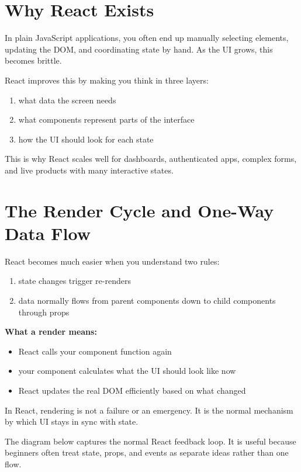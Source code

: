 \documentclass[12pt, a4paper, oneside]{book}
\begin{document}
\section{Why React Exists}

In plain JavaScript applications, you often end up manually selecting elements, updating the DOM, and coordinating state by hand. As the UI grows, this becomes brittle.

React improves this by making you think in three layers:
\begin{enumerate}[leftmargin=2em]
    \item what data the screen needs
    \item what components represent parts of the interface
    \item how the UI should look for each state
\end{enumerate}

This is why React scales well for dashboards, authenticated apps, complex forms, and live products with many interactive states.

\section{The Render Cycle and One-Way Data Flow}

React becomes much easier when you understand two rules:
\begin{enumerate}[leftmargin=2em]
    \item state changes trigger re-renders
    \item data normally flows from parent components down to child components through props
\end{enumerate}

\textbf{What a render means:}
\begin{itemize}[leftmargin=2em]
    \item React calls your component function again
    \item your component calculates what the UI should look like now
    \item React updates the real DOM efficiently based on what changed
\end{itemize}

\begin{intuitionbox}
In React, rendering is not a failure or an emergency. It is the normal mechanism by which UI stays in sync with state.
\end{intuitionbox}

The diagram below captures the normal React feedback loop. It is useful because beginners often treat state, props, and events as separate ideas rather than one flow.
\end{document}
